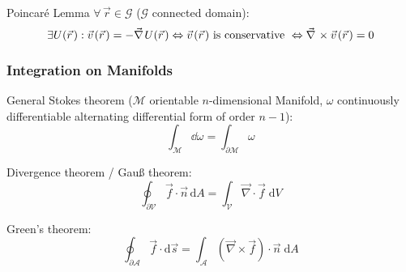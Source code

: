 			\noindent
			Poincaré Lemma $\forall\, \vec{r}\in\mathcal{G}$ ($\mathcal{G}$ connected domain):
			\begin{equation}
				\exists U(\vec{r}): \vec{v}(\vec{r}) = -\Nabla U(\vec{r})
				\Leftrightarrow \vec{v}(\vec{r}) \text{ is conservative }
				\Leftrightarrow \Nabla\times\vec{v}(\vec{r}) = 0
			\end{equation}

		\subsubsection{Integration on Manifolds}
			\noindent
			General Stokes theorem ($\mathcal{M}$ orientable $n$-dimensional Manifold, $\omega$ continuously differentiable alternating differential form of order $n-1$):
			\begin{equation}
				\int_\mathcal{M} \dd \omega = \int_{\partial\mathcal{M}} \omega
			\end{equation}

			\noindent
			Divergence theorem / Gauß theorem:
			\begin{equation}
				\oint_{\partial\mathcal{V}}\vec{f}\cdot\vec{n}\,\mathrm{d}A=\int_{\mathcal{V}}\vec{\nabla}\cdot\vec{f}\;\mathrm{d}V
			\end{equation}

			\noindent
			Green's theorem:
			\begin{equation}
				\oint_{\partial\mathcal{A}}\vec{f}\cdot\mathrm{d}\vec{s}=\int_{\mathcal{A}}\left(\vec{\nabla}\times\vec{f}\right)\cdot\vec{n}\;\mathrm{d}A
			\end{equation}

